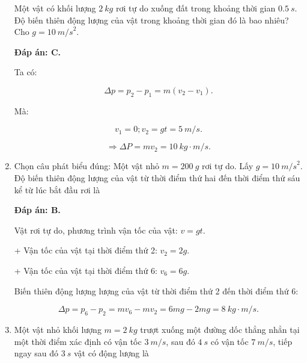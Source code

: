 \begin{enumerate}[label=\bfseries Câu \arabic*:]
	
	{Một vật có khối lượng $\SI{2}{kg}$ rơi tự do xuống đất trong khoảng thời gian $\SI{0,5}{s}$. Độ biến thiên động lượng của vật trong khoảng thời gian đó là bao nhiêu? Cho $g = \SI{10}{m/s}^2$. 
	}
	
	\hideall
	{	
		\textbf{Đáp án: C.}
		
		Ta có:
		
		$$\Delta p = p_2 - p_1 = m(v_2 - v_1).$$
		
		Mà:
		
		$$v_1 = 0; v_2 = gt = \SI{5}{m/s}.$$
		
		$$\Rightarrow \Delta P = mv_2 = \SI{10}{kg \cdot m/s}.$$
	}
	\item {}
	
	
	{Chọn câu phát biểu đúng: Một vật nhỏ $m =\SI{200}{g}$ rơi tự do. Lấy $g = \SI{10}{m/s}^2$. Độ biến thiên động lượng của vật từ thời điểm thứ hai đến thời điểm thứ sáu kể từ lúc bắt đầu rơi là
	}
	
	\hideall
	{	
		\textbf{Đáp án: B.}
		
		Vật rơi tự do, phương trình vận tốc của vật: $v=gt$.
		
		+ Vận tốc của vật tại thời điểm thứ 2: $v_2 = 2g.$
		
		+ Vận tốc của vật tại thời điểm thứ 6: $v_6 = 6g.$
		
		Biến thiên động lượng lượng của vật từ thời điểm thứ 2 đến thời điểm thứ 6:
		
		$$\Delta p = p_6 - p_2 = mv_6 - mv_2 = 6mg - 2mg = \SI{8}{kg \cdot m/s}.$$
		
	}
	\item {}
	
	
	{Một vật nhỏ khối lượng $m =\SI{2}{kg}$ trượt xuống một đường dốc thẳng nhẳn tại một thời điểm xác định có vận tốc $\SI{3}{m/s}$, sau đó $\SI{4}{s}$ có vận tốc $\SI{7}{m/s}$, tiếp ngay sau đó $\SI{3}{s}$ vật có động lượng là 
	}
	

\end{enumerate}

